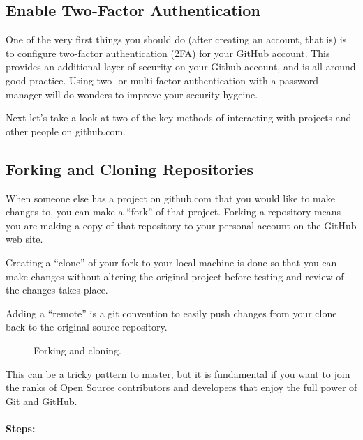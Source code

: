 \subsection{Enable Two-Factor Authentication}

\justify{}
One of the very first things you should do (after creating an account, that is) is to configure two-factor
authentication (2FA) for your GitHub account. This provides an additional layer of security on your Github account,
and is all-around good practice. Using two- or multi-factor authentication with a password manager will do wonders
to improve your security hygeine. 

\justify{}
Next let's take a look at two of the key methods of interacting with projects and other people on github.com.

\subsection{Forking and Cloning Repositories}

\justify{}
When someone else has a project on github.com that you would like to make changes to,
you can make a ``fork'' of that project. Forking a repository means you
are making a copy of that repository to your personal account on the GitHub web site.

\justify{}
Creating a ``clone'' of your fork to your local machine is done so that
you can make changes without altering the original project before testing and review of the changes takes place.

\justify{}
Adding a ``remote'' is a git convention to easily push changes from your clone back to
the original source repository.

\begin{figure}[!htb]

\caption{Forking and cloning.}
\label{forkandclone}
\end{figure}

\justify{}
This can be a tricky pattern to master, but it is fundamental if you
want to join the ranks of Open Source contributors and developers that
enjoy the full power of Git and GitHub.

\paragraph{Steps:}

